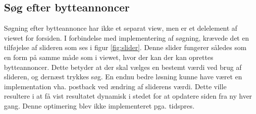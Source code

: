 \subsection{Søg efter bytteannoncer}
Søgning efter bytteannonce har ikke et separat view, men er et delelement af viewet for forsiden. I forbindelse med implementering af søgning, krævede det en tilføjelse af slideren som ses i figur \ref{fig:slider}. Denne slider fungerer således som en form på samme måde som i viewet, hvor der kan der kan oprettes bytteannoncer. Dette betyder at der skal vælges en bestemt værdi ved brug af slideren, og dernæst trykkes søg. En endnu bedre løsning kunne have været en implementation vha. postback ved ændring af sliderens værdi. Dette ville resultere i at få vist resultatet dynamisk i stedet for at opdatere siden fra ny hver gang. Denne optimering blev ikke implementeret pga. tidspres.